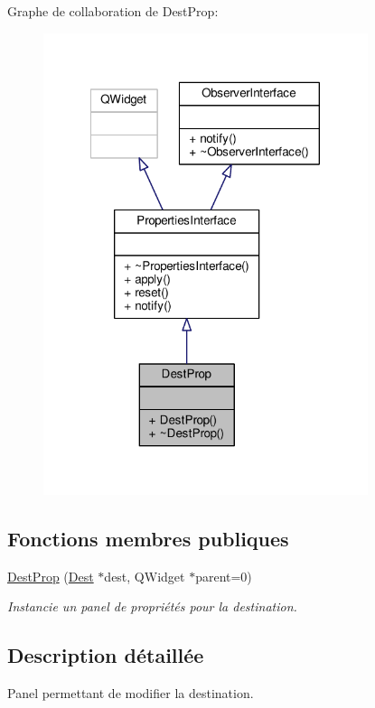 Graphe de collaboration de Dest\+Prop\+:\nopagebreak
\begin{figure}[H]
\begin{center}
\leavevmode
\includegraphics[width=269pt]{d4/d2b/classDestProp__coll__graph}
\end{center}
\end{figure}
\subsection*{Fonctions membres publiques}
\begin{DoxyCompactItemize}
\item 
\hyperlink{classDestProp_accf41a3f4a376030696fca6daff74cff}{Dest\+Prop} (\hyperlink{classDest}{Dest} $\ast$dest, Q\+Widget $\ast$parent=0)
\begin{DoxyCompactList}\small\item\em Instancie un panel de propriétés pour la destination. \end{DoxyCompactList}\end{DoxyCompactItemize}


\subsection{Description détaillée}
Panel permettant de modifier la destination. 

